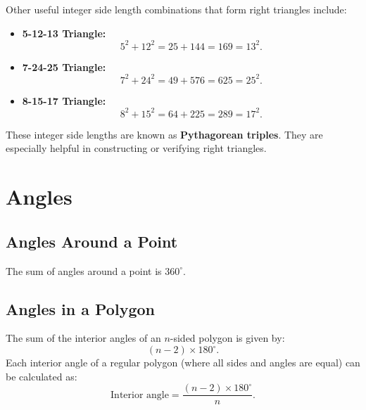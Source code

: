 \documentclass[12pt,a4paper]{article}
\begin{document}
Other useful integer side length combinations that form right triangles include:
\begin{itemize}
    \item \textbf{5-12-13 Triangle:}
    \[ 5^2 + 12^2 = 25 + 144 = 169 = 13^2. \]
    \item \textbf{7-24-25 Triangle:}
    \[ 7^2 + 24^2 = 49 + 576 = 625 = 25^2. \]
    \item \textbf{8-15-17 Triangle:}
    \[ 8^2 + 15^2 = 64 + 225 = 289 = 17^2. \]
\end{itemize}

These integer side lengths are known as \textbf{Pythagorean triples}. They are especially helpful in constructing or verifying right triangles.

\section*{Angles}

\subsection*{Angles Around a Point}
The sum of angles around a point is $360^\circ$.

\subsection*{Angles in a Polygon}
The sum of the interior angles of an $n$-sided polygon is given by:
\[
(n-2) \times 180^\circ.
\]
Each interior angle of a regular polygon (where all sides and angles are equal) can be calculated as:
\[
\text{Interior angle} = \frac{(n-2) \times 180^\circ}{n}.
\]
\end{document}
